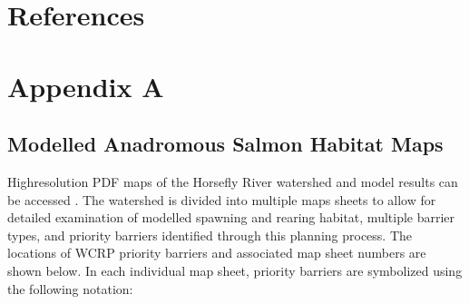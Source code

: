 \documentclass[letterpaper,10pt,english]{jupyterBook}
\let\sphinxpxdimen\pdfpxdimen\else\newdimen\sphinxpxdimen
\begin{document}
\chapter{References}
\label{\detokenize{references:references}}\label{\detokenize{references::doc}}
\sphinxstepscope


\chapter{Appendix A}
\label{\detokenize{AppendixA:appendix-a}}\label{\detokenize{AppendixA::doc}}

\section{Modelled Anadromous Salmon Habitat Maps}
\label{\detokenize{AppendixA:modelled-anadromous-salmon-habitat-maps}}
\sphinxAtStartPar
High\sphinxhyphen{}resolution PDF maps of the Horsefly River watershed and model results can be accessed . The watershed is divided into multiple maps sheets to allow for detailed examination of modelled spawning and rearing habitat, multiple barrier types, and priority barriers identified through this planning process. The locations of WCRP priority barriers and associated map sheet numbers are shown below. In each individual map sheet, priority barriers are symbolized using the following notation:

\begin{figure}[htbp]
\centering
\capstart

\noindent\sphinxincludegraphics[width=1000\sphinxpxdimen,height=400\sphinxpxdimen]{{figure8}.png}
\caption{}\label{\detokenize{AppendixA:fig8}}\end{figure}
\end{document}
